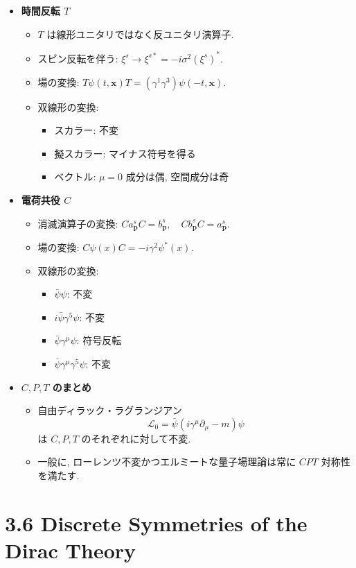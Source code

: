 \documentclass[a4paper,12pt]{article}
\begin{document}
\begin{itemize}
  \item \textbf{時間反転 $T$}
  \begin{itemize}
    \item $T$ は線形ユニタリではなく反ユニタリ演算子.
    \item スピン反転を伴う: $\xi^s \to \xi^{s*}=-i\sigma^2(\xi^s)^*$.
    \item 場の変換: $T\psi(t,\mathbf{x})T=(\gamma^1\gamma^3)\psi(-t,\mathbf{x})$.
    \item 双線形の変換:
    \begin{itemize}
      \item スカラー: 不変
      \item 擬スカラー: マイナス符号を得る
      \item ベクトル: $\mu=0$ 成分は偶, 空間成分は奇
    \end{itemize}
  \end{itemize}

  \item \textbf{電荷共役 $C$}
  \begin{itemize}
    \item 消滅演算子の変換: $Ca^s_{\mathbf{p}}C=b^s_{\mathbf{p}}, \quad Cb^s_{\mathbf{p}}C=a^s_{\mathbf{p}}$.
    \item 場の変換: $C\psi(x)C=-i\gamma^2\psi^*(x)$.
    \item 双線形の変換:
    \begin{itemize}
      \item $\bar{\psi}\psi$: 不変
      \item $i\bar{\psi}\gamma^5\psi$: 不変
      \item $\bar{\psi}\gamma^\mu\psi$: 符号反転
      \item $\bar{\psi}\gamma^\mu\gamma^5\psi$: 不変
    \end{itemize}
  \end{itemize}

  \item \textbf{$C,P,T$ のまとめ}
  \begin{itemize}
    \item 自由ディラック・ラグランジアン
    \[
    \mathcal{L}_0=\bar{\psi}(i\gamma^\mu\partial_\mu-m)\psi
    \]
    は $C,P,T$ のそれぞれに対して不変.
    \item 一般に, ローレンツ不変かつエルミートな量子場理論は常に $CPT$ 対称性を満たす.
  \end{itemize}
\end{itemize}


\newpage
\color{black}
\section*{3.6 Discrete Symmetries of the Dirac Theory}
\end{document}
